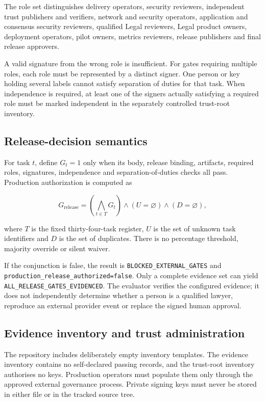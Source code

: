 The role set distinguishes delivery operators, security reviewers, independent
trust publishers and verifiers, network and security operators, application
and consensus security reviewers, qualified Legal reviewers, Legal product
owners, deployment operators, pilot owners, metrics reviewers, release
publishers and final release approvers.

A valid signature from the wrong role is insufficient.  For gates requiring
multiple roles, each role must be represented by a distinct signer.  One person
or key holding several labels cannot satisfy separation of duties for that
task.  When independence is required, at least one of the signers actually
satisfying a required role must be marked independent in the separately
controlled trust-root inventory.

\subsection{Release-decision semantics}

For task $t$, define $G_t=1$ only when its body, release binding, artifacts,
required roles, signatures, independence and separation-of-duties checks all
pass.  Production authorization is computed as

\begin{equation}
  G_{\mathrm{release}} =
  \left(\bigwedge_{t \in T} G_t\right)
  \land (U=\varnothing)
  \land (D=\varnothing),
\end{equation}

where $T$ is the fixed thirty-four-task register, $U$ is the set of unknown task
identifiers and $D$ is the set of duplicates.  There is no percentage threshold,
majority override or silent waiver.

If the conjunction is false, the result is
\texttt{BLOCKED\_EXTERNAL\_GATES} and
\texttt{production\_release\_authorized=false}.  Only a complete evidence set
can yield \texttt{ALL\_RELEASE\_GATES\_EVIDENCED}.  The evaluator verifies the
configured evidence; it does not independently determine whether a person is a
qualified lawyer, reproduce an external provider event or replace the signed
human approval.

\subsection{Evidence inventory and trust administration}

The repository includes deliberately empty inventory templates.  The evidence
inventory contains no self-declared passing records, and the trust-root
inventory authorises no keys.  Production operators must populate them only
through the approved external governance process.  Private signing keys must
never be stored in either file or in the tracked source tree.

